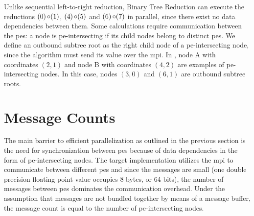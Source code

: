 Unlike sequential left-to-right reduction, Binary Tree Reduction can execute the reductions $(0) \operatorname{\circ} (1)$, $(4) \operatorname{\circ} (5)$ and $(6) \operatorname{\circ} (7)$ in parallel, since there exist no data dependencies between them.
Some calculations require communication between the \glspl{pe}:
a node is \gls{pe}-intersecting if its child nodes belong to distinct \glspl{pe}.
We define an outbound subtree root as the right child node of a \gls{pe}-intersecting node, since the algorithm must send its value over the \gls{mpi}.
In , node A with coordinates $(2,1)$ and node B with coordinates $(4,2)$ are examples of \gls{pe}-intersecting nodes.
In this case, nodes $(3,0)$ and $(6,1)$ are outbound subtree roots.

\section{Message Counts}
\label{sec:MessageCounts}
The main barrier to efficient parallelization as outlined in the previous section is the need for synchronization between \glspl{pe} because of data dependencies in the form of \gls{pe}-intersecting nodes.
The target implementation utilizes the \gls{mpi} to communicate between different \glspl{pe} and since the messages are small (one double precision floating-point value occupies 8 bytes, or 64 bits), the number of messages between \glspl{pe} dominates the communication overhead.
Under the assumption that messages are not bundled together by means of a message buffer, the message count is equal to the number of \gls{pe}-intersecting nodes.

